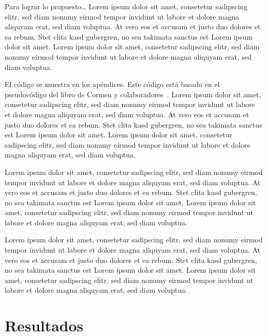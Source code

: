 \documentclass[twocolumn,english,spanish,journal]{IEEEtran}
\begin{document}
Para lograr lo propuesto\ldots{} Lorem ipsum dolor sit amet, consetetur
sadipscing elitr, sed diam nonumy eirmod tempor invidunt ut labore
et dolore magna aliquyam erat, sed diam voluptua. At vero eos et accusam
et justo duo dolores et ea rebum. Stet clita kasd gubergren, no sea
takimata sanctus est Lorem ipsum dolor sit amet. Lorem ipsum dolor
sit amet, consetetur sadipscing elitr, sed diam nonumy eirmod tempor
invidunt ut labore et dolore magna aliquyam erat, sed diam voluptua.

El código se muestra en los apéndices. Este código está basado en
el pseudocódigo del libro de Cormen y colaboradores~\cite{Cormen:2009}.
Lorem ipsum dolor sit amet, consetetur sadipscing elitr, sed diam
nonumy eirmod tempor invidunt ut labore et dolore magna aliquyam erat,
sed diam voluptua. At vero eos et accusam et justo duo dolores et
ea rebum. Stet clita kasd gubergren, no sea takimata sanctus est Lorem
ipsum dolor sit amet. Lorem ipsum dolor sit amet, consetetur sadipscing
elitr, sed diam nonumy eirmod tempor invidunt ut labore et dolore
magna aliquyam erat, sed diam voluptua.

Lorem ipsum dolor sit amet, consetetur sadipscing elitr, sed diam
nonumy eirmod tempor invidunt ut labore et dolore magna aliquyam erat,
sed diam voluptua. At vero eos et accusam et justo duo dolores et
ea rebum. Stet clita kasd gubergren, no sea takimata sanctus est Lorem
ipsum dolor sit amet. Lorem ipsum dolor sit amet, consetetur sadipscing
elitr, sed diam nonumy eirmod tempor invidunt ut labore et dolore
magna aliquyam erat, sed diam voluptua.

Lorem ipsum dolor sit amet, consetetur sadipscing elitr, sed diam
nonumy eirmod tempor invidunt ut labore et dolore magna aliquyam erat,
sed diam voluptua. At vero eos et accusam et justo duo dolores et
ea rebum. Stet clita kasd gubergren, no sea takimata sanctus est Lorem
ipsum dolor sit amet. Lorem ipsum dolor sit amet, consetetur sadipscing
elitr, sed diam nonumy eirmod tempor invidunt ut labore et dolore
magna aliquyam erat, sed diam voluptua.


\section{Resultados}
\end{document}
